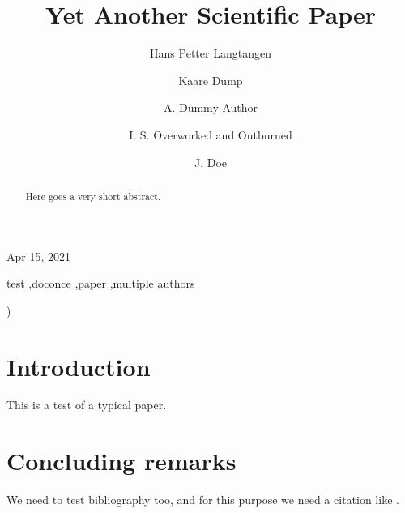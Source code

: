 \documentclass[final]{elsarticle}
\begin{document}

\newcommand{\exercisesection}[1]{\subsection*{#1}}








\begin{frontmatter}

\title{Yet Another Scientific Paper}


\author[inst1,inst2]{Hans Petter Langtangen}
\author[inst3]{Kaare Dump}
\author[]{A. Dummy Author}
\author[inst4,inst5,inst6,inst7]{I. S. Overworked and Outburned}
\author[]{J. Doe}\address[inst1]{Center for Biomedical Computing, Simula Research Laboratory}
\address[inst2]{Department of Informatics, University of Oslo}
\address[inst3]{Segfault, Cyberspace}
\address[inst4]{Inst1}
\address[inst5]{Inst2, Somewhere}
\address[inst6]{Third Inst, Elsewhere}
\address[inst7]{Fourth Inst}


\begin{center}
Apr 15, 2021
\end{center}

\vspace{1cm}

\begin{abstract}
Here goes
a very short
abstract.
\end{abstract}


\begin{keyword}
test \sep doconce \sep paper \sep multiple authors
\end{keyword}

\end{frontmatter}

)


\vspace{1cm} %

\section{Introduction}

This is a test of a typical paper.

\section{Concluding remarks}

We need to test bibliography too, and for this purpose we need
a citation like \cite{Langtangen_1992c,Langtangen_1994a}.





\end{document}
